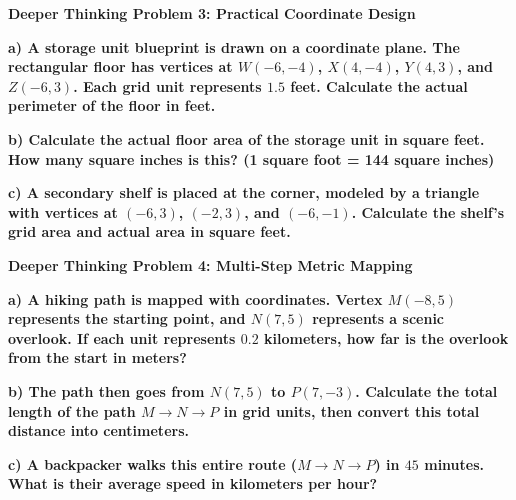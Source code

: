 \documentclass[12pt, letterpaper, fleqn]{article}
\begin{document}
\begin{tcolorbox}[colback=black!5, colframe=black!50, boxrule=1pt, arc=4mm, left=6mm, right=6mm, top=5mm, bottom=5mm]
\textbf{Deeper Thinking Problem 3: Practical Coordinate Design}

\medskip

\noindent
\textbf{a) A storage unit blueprint is drawn on a coordinate plane. The rectangular floor has vertices at $W(-6, -4)$, $X(4, -4)$, $Y(4, 3)$, and $Z(-6, 3)$. Each grid unit represents $1.5$ feet. Calculate the actual perimeter of the floor in feet.}

\vspace{3cm}

\noindent
\textbf{b) Calculate the actual floor area of the storage unit in square feet. How many square inches is this? (1 square foot = 144 square inches)}

\vspace{3cm}

\noindent
\textbf{c) A secondary shelf is placed at the corner, modeled by a triangle with vertices at $(-6, 3)$, $(-2, 3)$, and $(-6, -1)$. Calculate the shelf's grid area and actual area in square feet.}

\vspace{2.5cm}
\end{tcolorbox}
\newpage

\begin{tcolorbox}[colback=black!5, colframe=black!50, boxrule=1pt, arc=4mm, left=6mm, right=6mm, top=5mm, bottom=5mm]
\textbf{Deeper Thinking Problem 4: Multi-Step Metric Mapping}

\medskip

\noindent
\textbf{a) A hiking path is mapped with coordinates. Vertex $M(-8, 5)$ represents the starting point, and $N(7, 5)$ represents a scenic overlook. If each unit represents $0.2$ kilometers, how far is the overlook from the start in meters?}

\vspace{3cm}

\noindent
\textbf{b) The path then goes from $N(7, 5)$ to $P(7, -3)$. Calculate the total length of the path $M \rightarrow N \rightarrow P$ in grid units, then convert this total distance into centimeters.}

\vspace{3cm}

\noindent
\textbf{c) A backpacker walks this entire route ($M \rightarrow N \rightarrow P$) in $45$ minutes. What is their average speed in kilometers per hour?}

\vspace{2.5cm}
\end{tcolorbox}
\end{document}
